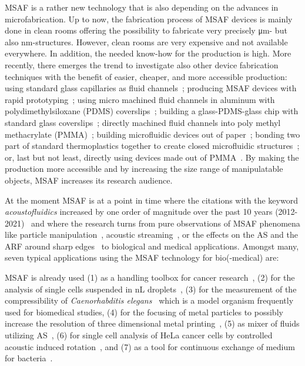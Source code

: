 MSAF is a rather new technology that is also depending on the advances in 
microfabrication. Up to now, the fabrication process of MSAF devices is mainly 
done in clean rooms offering the possibility to fabricate very precisely 
\si{\um}- but also \si{\nm}-structures. However, clean rooms are very expensive 
and not available everywhere. In addition, the needed know-how for the 
production is high. More recently, there emerges the trend to investigate also 
other device fabrication techniques with the benefit of easier, cheaper, and 
more accessible production: using standard glass capillaries as fluid 
channels~\cite{Wiklund2001,Hammarstrom2010,Hammarstrom2012,Mishra2014,Gralinski2014,Gerlt2022}; 
producing MSAF devices with rapid prototyping~\cite{Adams2012}; using micro 
machined fluid channels in aluminum with polydimethylsiloxane (PDMS) 
coverslips~\cite{Gautam2018}; building a glass-PDMS-glass chip with standard 
glass coverslips~\cite{Xu2019}; directly machined fluid channels into poly 
methyl methacrylate (PMMA)~\cite{Harris2012}; building microfluidic devices out 
of paper~\cite{Martinez2010}; bonding two part of standard thermoplastics 
together to create closed microfluidic structures~\cite{Mueller2013}; or, last 
but not least, directly using devices made out of 
PMMA~\cite{Gonzalez2015,Yang2017}. By making the production more accessible and 
by increasing the size range of manipulatable objects, MSAF increases its 
research audience.

At the moment MSAF is at a point in time where the citations with the keyword 
\emph{acoustofluidics} increased by one order of magnitude over the past 10 
years (2012-2021)~\cite{Novotny2021} and where the research turns from pure 
observations of MSAF phenomena like particle 
manipulation~\cite{Wiklund2012a,Laurell2007,Collins2016,Gedge2012,Ding2012b,Cetin2016b,Aubert2016,Novotny2021}, 
acoustic streaming~\cite{Hoyos2013,Castro2016,Lei2016}, or the effects on the 
AS and the ARF around sharp 
edges~\cite{Leibacher2015,Chen2021,Doinikov2020,Doinikov2020b} to biological 
and medical applications. Amongst many, seven typical applications using the 
MSAF technology for bio(-medical) are:

MSAF is already used (1) as a handling toolbox for cancer 
research~\cite{Antfolk2015,Wu2021,Wang2020,Nguyen2021}, (2) for the analysis of 
single cells suspended in \si{\nano\liter} droplets~\cite{Gerlt2020a}, (3) for 
the measurement of the compressibility of \emph{Caenorhabditis 
elegans}~\cite{Baasch2018} which is a model organism frequently used for 
biomedical studies, (4) for the focusing of metal particles to possibly 
increase the resolution of three dimensional metal printing~\cite{Gerlt2022}, 
(5) as mixer of fluids utilizing 
AS~\cite{Patel2014,Ozcelik2014,Bachman2020,Zhang2021}, (6) for single cell 
analysis of HeLa cancer cells by controlled acoustic induced 
rotation~\cite{Laeubli2021}, and (7) as a tool for continuous exchange of 
medium for bacteria~\cite{Gerlt2021}.

